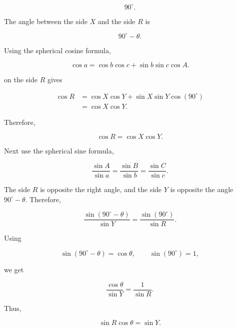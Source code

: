 \documentclass[12pt]{extarticle}
\begin{document}
\begin{equation} 90^\circ . \end{equation}

The angle between the side $X$ and the side $R$ is

\begin{equation} 90^\circ - \theta . \end{equation}

Using the spherical cosine formula,

\begin{equation}
\cos a=\cos b\cos c+\sin b\sin c\cos A.
\label{eq:spherical-cosine-law}
\end{equation}

on the side $R$ gives

\begin{align}
\cos R
&= \cos X \cos Y + \sin X \sin Y \cos(90^\circ) \\[4pt]
&= \cos X \cos Y .
\end{align}

Therefore,

\begin{equation}
\boxed{\cos R=\cos X\cos Y}.
\label{eq:local-separation}
\end{equation}

Next use the spherical sine formula,

\begin{equation} \frac{\sin A}{\sin a} = \frac{\sin B}{\sin b} = \frac{\sin C}{\sin c}. \end{equation}

The side $R$ is opposite the right angle, and the side $Y$ is opposite the angle $90^\circ-\theta$. Therefore,

\begin{equation} \frac{\sin(90^\circ-\theta)}{\sin Y} = \frac{\sin(90^\circ)}{\sin R}. \end{equation}

Using

\begin{equation} \sin(90^\circ-\theta)=\cos\theta, \qquad \sin(90^\circ)=1, \end{equation}

we get

\begin{equation} \frac{\cos\theta}{\sin Y} = \frac{1}{\sin R}. \end{equation}

Thus,

\begin{equation}
\boxed{\sin R\cos\theta=\sin Y}.
\label{eq:local-y-component}
\end{equation}
\end{document}
